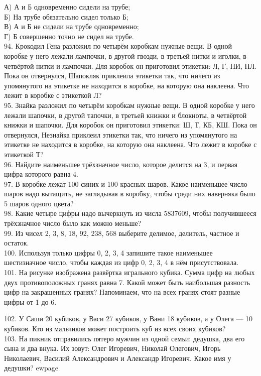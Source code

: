 А) А и Б одновременно сидели на трубе;\\
Б) На трубе обязательно сидел только Б;\\
В) А и Б не сидели на трубе одновременно;\\
Г) Б совершенно точно не сидел на трубе.\\
94. Крокодил Гена разложил по четырём коробкам нужные вещи. В одной коробке у него лежали лампочки, в другой гвозди, в третьей нитки и иголки, в четвёртой нитки и лампочки. Для коробок он приготовил этикетки: Л, Г, НИ, НЛ. Пока он отвернулся, Шапокляк приклеила этикетки так, что ничего из упомянутого на этикетке не находится в коробке, на которую она наклеена. Что лежит в коробке с этикеткой Л?\\
95. Знайка разложил по четырём коробкам нужные вещи. В одной коробке у него лежали шапочки, в другой тапочки, в третьей книжки и блокноты, в четвёртой книжки и шапочки. Для коробок он приготовил этикетки: Ш, Т, КБ, КШ. Пока он отвернулся, Незнайка приклеил этикетки так, что ничего из упомянутого на этикетке не находится в коробке, на которую она наклеена. Что лежит в коробке с этикеткой Т?\\
96. Найдите наименьшее трёхзначное число, которое делится на 3, и первая цифра которого равна 4.\\
97. В коробке лежат 100 синих и 100 красных шаров. Какое наименьшее число шаров надо вытащить, не заглядывая в коробку, чтобы среди них наверняка было 5 шаров одного цвета?\\
98. Какие четыре цифры надо вычеркнуть из числа 5837609, чтобы получившееся трёхзначное число было как можно меньше?\\
99. Из чисел 2, 3, 8, 18, 92, 238, 568 выберите делимое, делитель, частное и остаток.\\
100. Используя только цифры 0, 2, 3, 4 запишите такое наименьшее шестизначное число, чтобы каждая из цифр 0, 2, 3, 4 в нём присутствовала.\\
101. На рисунке изображена развёртка игрального кубика. Сумма цифр на любых двух противоположных гранях равна 7. Какой может быть наибольшая разность цифр на закрашенных гранях? Напоминаем, что на всех гранях стоят разные цифры от 1 до 6.
\begin{center}
\begin{figure}[ht!]
\end{figure}
\end{center}
102. У Саши 20 кубиков, у Васи 27 кубиков, у Вани 18 кубиков, а у Олега --- 10 кубиков. Кто из мальчиков может построить куб из всех своих кубиков?\\
103. На пикник отправились пятеро мужчин из одной семьи: дедушка, два его сына и два внука. Их зовут: Олег Игоревич, Николай Олегович, Игорь Николаевич, Василий Александрович и Александр Игоревич. Какое имя у дедушки?
ewpage

